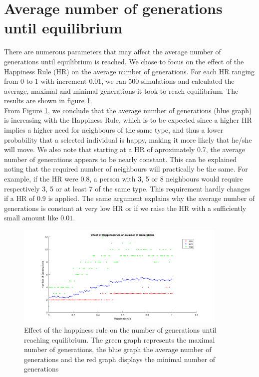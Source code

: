 
\section{Average number of generations until equilibrium}\label{sec:aantgen}
There are numerous parameters that may affect the average number of generations until  equilibrium is reached. 
We chose to focus on the effect of the Happiness Rule (HR) on the average number of generations. 
For each HR ranging from 0 to 1 with increment 0.01, we ran 500 simulations and calculated the average, maximal and minimal generations it took to reach equilibrium. 
The results are shown in figure \ref{fig:avegen}.\\

From Figure \ref{fig:avegen}, we conclude that the average number of generations (blue graph) is increasing with the Happiness Rule, which is to be expected since a higher HR implies a higher need for neighbours of the same type, and thus a lower probability that a selected individual is happy, making it more likely that he/she will move. 
We also note that starting at a HR of aproximately 0.7, the average number of generations appears to be nearly constant. 
This can be explained noting that the required number of neighbours will practically be the same. 
For example, if the HR were 0.8, a person with 3, 5 or 8 neighbours would require respectively 3, 5 or at least 7 of the same type. 
This requirement hardly changes if a HR of 0.9 is applied. 
The same argument explains why the average number of generations is constant at very low HR or if we raise the HR with a sufficiently small amount like $0.01$.

\begin{figure}[h!]
    \centering
    \includegraphics[width=0.9\textwidth]{happinessregel_aantgen_2.pdf}
    \caption{Effect of the happiness rule on the number of generations until reaching equilibrium. 
    The green graph represents the maximal number of generations, the blue graph the average number of generations and the red graph displays the minimal number of generations}
    \label{fig:avegen}
\end{figure}

